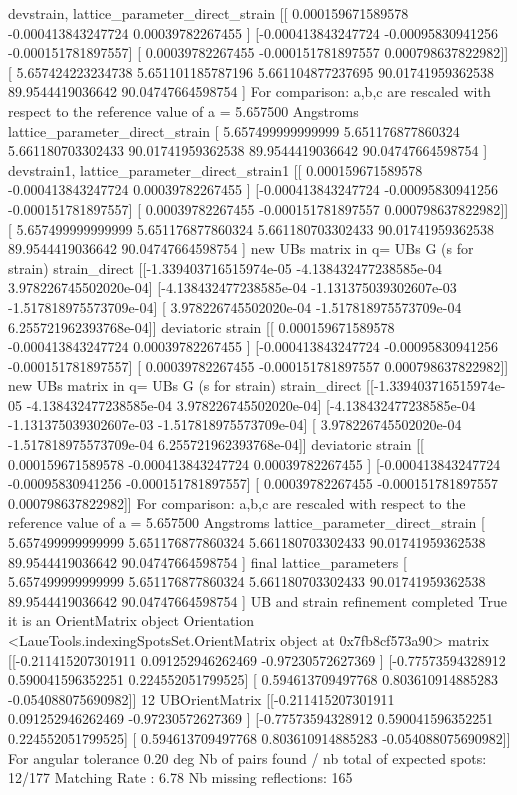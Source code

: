\documentclass[letterpaper,10pt,english]{sphinxmanual}
\begin{document}
\begin{sphinxalltt}
devstrain, lattice\_parameter\_direct\_strain {[}{[} 0.000159671589578 -0.000413843247724  0.00039782267455 {]}
 {[}-0.000413843247724 -0.00095830941256  -0.000151781897557{]}
 {[} 0.00039782267455  -0.000151781897557  0.000798637822982{]}{]} {[} 5.657424223234738  5.651101185787196  5.661104877237695
 90.01741959362538  89.9544419036642   90.04747664598754 {]}
For comparison: a,b,c are rescaled with respect to the reference value of a = 5.657500 Angstroms
lattice\_parameter\_direct\_strain {[} 5.657499999999999  5.651176877860324  5.661180703302433
 90.01741959362538  89.9544419036642   90.04747664598754 {]}
devstrain1, lattice\_parameter\_direct\_strain1 {[}{[} 0.000159671589578 -0.000413843247724  0.00039782267455 {]}
 {[}-0.000413843247724 -0.00095830941256  -0.000151781897557{]}
 {[} 0.00039782267455  -0.000151781897557  0.000798637822982{]}{]} {[} 5.657499999999999  5.651176877860324  5.661180703302433
 90.01741959362538  89.9544419036642   90.04747664598754 {]}
new UBs matrix in q= UBs G (s for strain)
strain\_direct {[}{[}-1.339403716515974e-05 -4.138432477238585e-04  3.978226745502020e-04{]}
 {[}-4.138432477238585e-04 -1.131375039302607e-03 -1.517818975573709e-04{]}
 {[} 3.978226745502020e-04 -1.517818975573709e-04  6.255721962393768e-04{]}{]}
deviatoric strain {[}{[} 0.000159671589578 -0.000413843247724  0.00039782267455 {]}
 {[}-0.000413843247724 -0.00095830941256  -0.000151781897557{]}
 {[} 0.00039782267455  -0.000151781897557  0.000798637822982{]}{]}
new UBs matrix in q= UBs G (s for strain)
strain\_direct {[}{[}-1.339403716515974e-05 -4.138432477238585e-04  3.978226745502020e-04{]}
 {[}-4.138432477238585e-04 -1.131375039302607e-03 -1.517818975573709e-04{]}
 {[} 3.978226745502020e-04 -1.517818975573709e-04  6.255721962393768e-04{]}{]}
deviatoric strain {[}{[} 0.000159671589578 -0.000413843247724  0.00039782267455 {]}
 {[}-0.000413843247724 -0.00095830941256  -0.000151781897557{]}
 {[} 0.00039782267455  -0.000151781897557  0.000798637822982{]}{]}
For comparison: a,b,c are rescaled with respect to the reference value of a = 5.657500 Angstroms
lattice\_parameter\_direct\_strain {[} 5.657499999999999  5.651176877860324  5.661180703302433
 90.01741959362538  89.9544419036642   90.04747664598754 {]}
final lattice\_parameters {[} 5.657499999999999  5.651176877860324  5.661180703302433
 90.01741959362538  89.9544419036642   90.04747664598754 {]}
UB and strain refinement completed
True it is an OrientMatrix object
Orientation \textless{}LaueTools.indexingSpotsSet.OrientMatrix object at 0x7fb8cf573a90\textgreater{}
matrix {[}{[}-0.211415207301911  0.091252946262469 -0.97230572627369 {]}
 {[}-0.77573594328912   0.590041596352251  0.224552051799525{]}
 {[} 0.594613709497768  0.803610914885283 -0.054088075690982{]}{]}
 12
UBOrientMatrix {[}{[}-0.211415207301911  0.091252946262469 -0.97230572627369 {]}
 {[}-0.77573594328912   0.590041596352251  0.224552051799525{]}
 {[} 0.594613709497768  0.803610914885283 -0.054088075690982{]}{]}
For angular tolerance 0.20 deg
Nb of pairs found / nb total of expected spots: 12/177
Matching Rate : 6.78
Nb missing reflections: 165


\end{sphinxalltt}
\end{document}
